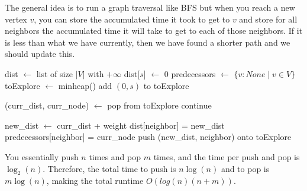   \begin{algo}
    The general idea is to run a graph traversal like BFS but when you reach a new vertex $v$, you can store the accumulated time it took to get to $v$ and store for all neighbors the accumulated time it will take to get to each of those neighbors. If it is less than what we have currently, then we have found a shorter path and we should update this. 
    \begin{algorithm}[H]
      \label{alg:dijkstra}
      \begin{algorithmic}[1]
          \State dist $\gets$ list of size $|V|$ with $+\infty$ 
          \State dist[$s$] $\gets$ 0 
          \State predecessors $\gets$ $\{v : None \mid v \in V \}$ 
          \State toExplore $\gets$ minheap() 
          \State add $(0, s)$ to toExplore 

          \State (curr\_dist, curr\_node) $\gets$ pop from toExplore  
              
              \State continue 
            \EndIf 

             
              \State new\_dist $\gets$ curr\_dist + weight 
               
                \State dist[neighbor] = new\_dist 
                \State predecessors[neighbor] = curr\_node 
                \State push (new\_dist, neighbor) onto toExplore 
              \EndIf
            \EndFor
          \EndWhile
          \State {}
        \EndFunction
      \end{algorithmic}
    \end{algorithm}

    You essentially push $n$ times and pop $m$ times, and the time per push and pop is $\log_2 (n)$. Therefore, the total time to push is $n \log(n)$ and to pop is $m \log (n)$, making the total runtime $O(log(n) (n+m))$. 
  \end{algo}

